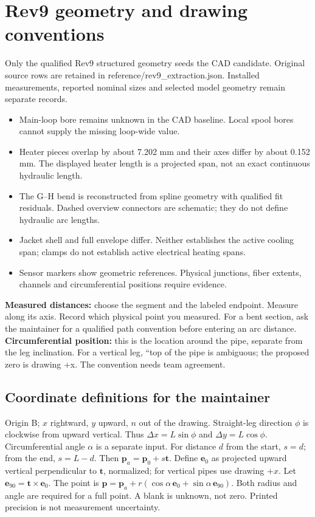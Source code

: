 \documentclass[11pt]{article}
\begin{document}
\clearpage\section{Rev9 geometry and drawing conventions}
Only the qualified Rev9 structured geometry seeds the CAD candidate. Original source rows are retained in reference/rev9\_extraction.json. Installed measurements, reported nominal sizes and selected model geometry remain separate records.
\begin{itemize}
\item Main-loop bore remains unknown in the CAD baseline. Local spool bores cannot supply the missing loop-wide value.
\item Heater pieces overlap by about 7.202 mm and their axes differ by about 0.152 mm. The displayed heater length is a projected span, not an exact continuous hydraulic length.
\item The G--H bend is reconstructed from spline geometry with qualified fit residuals. Dashed overview connectors are schematic; they do not define hydraulic arc lengths.
\item Jacket shell and full envelope differ. Neither establishes the active cooling span; clamps do not establish active electrical heating spans.
\item Sensor markers show geometric references. Physical junctions, fiber extents, channels and circumferential positions require evidence.
\end{itemize}
\textbf{Measured distances:} choose the segment and the labeled endpoint. Measure along its axis. Record which physical point you measured. For a bent section, ask the maintainer for a qualified path convention before entering an arc distance.
\textbf{Circumferential position:} this is the location around the pipe, separate from the leg inclination. For a vertical leg, ``top of the pipe is ambiguous; the proposed zero is drawing +x. The convention needs team agreement.
\subsection*{Coordinate definitions for the maintainer}
Origin B; $x$ rightward, $y$ upward, $n$ out of the drawing. Straight-leg direction $\phi$ is clockwise from upward vertical. Thus $\Delta x=L\sin\phi$ and $\Delta y=L\cos\phi$. Circumferential angle $\alpha$ is a separate input.
For distance $d$ from the start, $s=d$; from the end, $s=L-d$. Then $\mathbf{p}_{a}=\mathbf{p}_0+s\mathbf{t}$. Define $\mathbf{e}_0$ as projected upward vertical perpendicular to $\mathbf{t}$, normalized; for vertical pipes use drawing $+x$. Let $\mathbf{e}_{90}=\mathbf{t}\times\mathbf{e}_0$. The point is $\mathbf{p}=\mathbf{p}_{a}+r(\cos\alpha\,\mathbf{e}_0+\sin\alpha\,\mathbf{e}_{90})$.
Both radius and angle are required for a full point. A blank is unknown, not zero. Printed precision is not measurement uncertainty.
\end{document}

